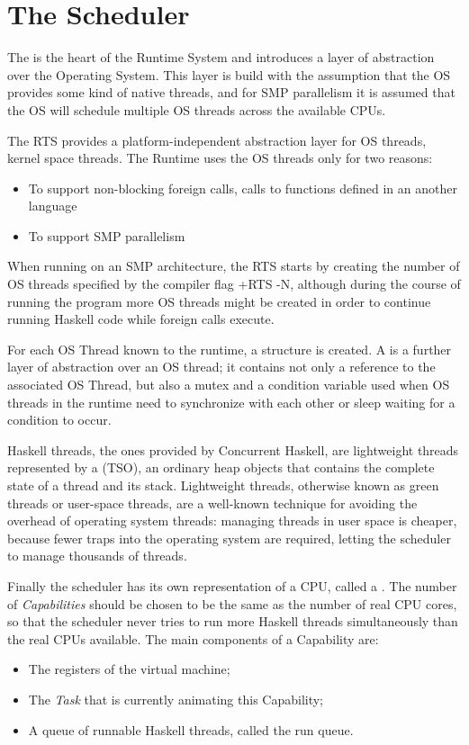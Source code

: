 \section{The Scheduler}
The   is the heart of the Runtime System and introduces a layer of abstraction over the Operating System.
This layer is build with the assumption that the OS provides some kind of native threads, and for SMP parallelism it is assumed that the OS will schedule multiple OS threads across the available CPUs.

The RTS provides a platform-independent abstraction layer for OS threads, \ie kernel space threads. The Runtime uses the OS threads only for two reasons:
\begin{itemize}
\item To support non-blocking foreign calls, \ie calls to functions defined in an another language
\item To support SMP parallelism
\end{itemize}

When running on an SMP architecture, the RTS starts by creating the number of OS threads specified by the compiler flag +RTS -N, although during the course of running the program more OS threads might be created in order to continue running Haskell code while foreign calls execute.

For each OS Thread known to the runtime, a  structure is created. A  is a further layer of abstraction over an OS thread; it contains not only a reference to the associated OS Thread, but also a mutex and a condition variable used when OS threads in the runtime need to synchronize with each other or sleep waiting for a condition to occur.

Haskell threads, the ones provided by Concurrent Haskell, are lightweight threads represented by a  (TSO), an ordinary heap objects that contains the complete state of a thread and its stack.
Lightweight threads, otherwise known as green threads or user-space threads,
are a well-known technique for avoiding the overhead of operating system threads: managing threads in user space is cheaper, because fewer traps into the operating system are required, letting the scheduler to manage thousands of threads.

Finally the scheduler has its own representation of a CPU, called a . The number of \emph{Capabilities} should be  chosen to be the same as the number of real CPU cores, so that the scheduler never tries to run more Haskell threads simultaneously than the real CPUs available.
The main components of a Capability are:
\begin{itemize}
\item The registers of the virtual machine;
\item The \emph{Task} that is currently animating this Capability;
\item A queue of runnable Haskell threads, called the run queue.
\end{itemize}

